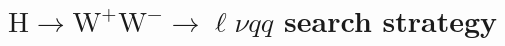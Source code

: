 \documentclass{PoS}
\newcommand{\Hi}{\ensuremath{\mathrm{H}}}
\newcommand{\W}{\ensuremath{\mathrm{W}}}
\newcommand{\WW}{\ensuremath{\W^+\W^-}}
\newcommand{\ttbar}{\ensuremath{\mathrm{t}\bar{\mathrm{t}}}}
\newcommand{\usedLumi}{5.1 fb {\ensuremath{^{-1}}}}
\begin{document}


\section{$\Hi \to \WW \to \ell\nu qq$ search strategy}
\label{sec:hwwlnu2q}
\end{document}
